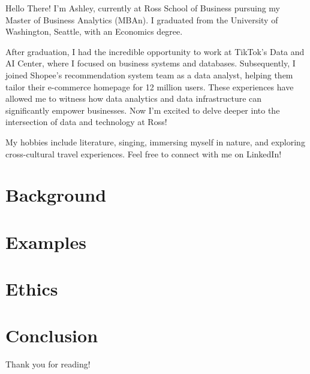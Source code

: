 \documentclass[
]{book}
\begin{document}
Hello There! I'm Ashley, currently at Ross School of Business pursuing my Master of Business Analytics (MBAn). I graduated from the University of Washington, Seattle, with an Economics degree.

After graduation, I had the incredible opportunity to work at TikTok's Data and AI Center, where I focused on business systems and databases. Subsequently, I joined Shopee's recommendation system team as a data analyst, helping them tailor their e-commerce homepage for 12 million users. These experiences have allowed me to witness how data analytics and data infrastructure can significantly empower businesses. Now I'm excited to delve deeper into the intersection of data and technology at Ross!

My hobbies include literature, singing, immersing myself in nature, and exploring cross-cultural travel experiences. Feel free to connect with me on LinkedIn!

\hypertarget{background}{%
\chapter*{Background}\label{background}}

\hypertarget{examples}{%
\chapter*{Examples}\label{examples}}

\hypertarget{ethics}{%
\chapter*{Ethics}\label{ethics}}

\hypertarget{conclusion}{%
\chapter{Conclusion}\label{conclusion}}

Thank you for reading!
\end{document}
